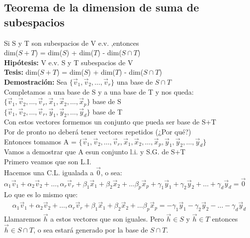 \documentclass[11pt]{article}
\begin{document}
\subsection{Teorema de la dimension de suma de subespacios}
Si S y T son subespacios de V e.v. ,entonces\\
dim($S+T$) = dim($S$) + dim($T$) - dim($S \cap T$)\\
{\bfseries {Hipótesis:}} V e.v. S y T subespacios de V  \\
{\bfseries {Tesis:}} dim($S+T$) = dim($S$) + dim($T$) - dim($S \cap T$)\\
{\bfseries {Demostración:}} Sea $\{\vec{v}_1, \vec{v}_2, \hdots, \vec{v}_r\}$ una base de $S \cap T$\\
Completamos a una base de S y a una base de T y nos queda: \\
$\{\vec{v}_1, \vec{v}_2, \hdots, \vec{v}_r, \vec{x}_1, \vec{x}_2, \hdots, \vec{x}_p\}$ base de S \\
$\{\vec{v}_1, \vec{v}_2, \hdots, \vec{v}_r, \vec{y}_1, \vec{y}_2, \hdots, \vec{y}_d\}$ base de T \\
Con estos vectores formemos un conjunto que pueda ser base de S+T\\
Por de pronto no deberá tener vectores repetidos (¿Por qué?)\\
Entonces tomamos A = $\{\vec{v}_1, \vec{v}_2, \hdots, \vec{v}_r, \vec{x}_1, \vec{x}_2, \hdots, \vec{x}_p, \vec{y}_1, \vec{y}_2, \hdots, \vec{y}_d\}$\\
Vamos a demostrar que A esun conjunto l.i. y S.G. de S+T\\
Primero veamos que son L.I.\\
Hacemos una C.L. igualada a $\vec{0}$, o sea: \\
$\alpha_1\vec{v}_1 + \alpha_2\vec{v}_2 + \hdots, \alpha_r\vec{v}_r + \beta_1\vec{x}_1 + \beta_2\vec{x}_2 + \hdots \beta_p\vec{x}_p + \gamma_1\vec{y}_1 + \gamma_2\vec{y}_2 + \hdots + \gamma_d\vec{y}_d = \vec{0}$\\
Lo que es lo mismo que: 
\begin{align}
\alpha_1\vec{v}_1 + \alpha_2\vec{v}_2 + \hdots, \alpha_r\vec{v}_r + \beta_1\vec{x}_1 + \beta_2\vec{x}_2 + \hdots \beta_p\vec{x}_p  = - \gamma_1\vec{y}_1 - \gamma_2\vec{y}_2 - \hdots - \gamma_d\vec{y}_d
\end{align}
Llamaremos $\vec{h}$ a estos vectores que son iguales. Pero $\vec{h} \in S$ y $\vec{h} \in T$ entonces $\vec{h} \in S \cap T$, o sea estará generado por la base de $S \cap T$. \\
\end{document}
